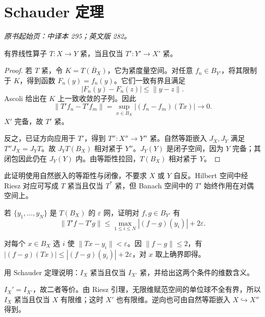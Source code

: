 \section{Schauder 定理}\label{sec:yosida-10-04}
\noindent\textit{原书起始页：中译本 295；英文版 282。}

\begin{theorem}[紧性的对偶刻画]\label{thm:y10-schauder}
有界线性算子 $T:X\to Y$ 紧，当且仅当 $T':Y'\to X'$ 紧。
\end{theorem}
\begin{proof}
若 $T$ 紧，令 $K=\overline{T(B_X)}$，它为紧度量空间。对任意 $f_n\in B_{Y'}$，将其限制于 $K$，得到函数 $F_n(y)=f_n(y)$。它们一致有界且满足
\[
 |F_n(y)-F_n(z)|\le\|y-z\|.
\]
Ascoli 给出在 $K$ 上一致收敛的子列。因此
\[
 \|T'f_n-T'f_m\|
 =\sup_{x\in B_X}|(f_n-f_m)(Tx)|\longrightarrow0.
\]
$X'$ 完备，故 $T'$ 紧。

反之，已证方向应用于 $T'$，得到 $T'':X''\to Y''$ 紧。自然等距嵌入 $J_X,J_Y$ 满足 $T''J_X=J_YT$。故 $J_YT(B_X)$ 相对紧于 $Y''$。$J_Y(Y)$ 是闭子空间，因为 $Y$ 完备；其闭包因此仍在 $J_Y(Y)$ 内。由等距性拉回，$T(B_X)$ 相对紧于 $Y$。
\end{proof}

此证明使用自然嵌入的等距性与闭像，不要求 $X$ 或 $Y$ 自反。Hilbert 空间中经 Riesz 对应可写成 $T$ 紧当且仅当 $T^*$ 紧，但 Banach 空间中的 $T'$ 始终作用在对偶空间上。

\begin{exercise}[对偶方向的估计]\label{ex:y10-adjoint-net}
若 $\{y_1,\ldots,y_N\}$ 是 $T(B_X)$ 的 $\varepsilon$ 网，证明对 $f,g\in B_{Y'}$ 有
\[
 \|T'f-T'g\|\le\max_{1\le i\le N}|(f-g)(y_i)|+2\varepsilon.
\]
\end{exercise}
\begin{solution}
对每个 $x\in B_X$ 选 $i$ 使 $\|Tx-y_i\|<\varepsilon$。因 $\|f-g\|\le2$，有 $|(f-g)(Tx)|\le|(f-g)(y_i)|+2\varepsilon$，对 $x$ 取上确界即得。
\end{solution}

\begin{exercise}[恒等算子]\label{ex:y10-identity}
用 Schauder 定理说明：$I_X$ 紧当且仅当 $I_{X'}$ 紧，并给出这两个条件的维数含义。
\end{exercise}
\begin{solution}
$I_X'=I_{X'}$，故二者等价。由 Riesz 引理，无限维赋范空间的单位球不全有界，所以 $I_X$ 紧当且仅当 $X$ 有限维；这时 $X'$ 也有限维。逆向也可由自然等距嵌入 $X\hookrightarrow X''$ 得到。
\end{solution}
